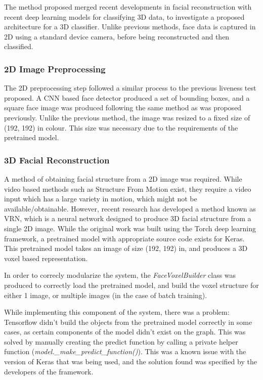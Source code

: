 \documentclass[11pt,a4paper]{article}
\begin{document}
            The method proposed merged recent developments in facial reconstruction with recent deep learning models for classifying 3D data, to investigate a proposed
            architecture for a 3D classifier. Unlike previous methods, face data is captured in 2D using a standard device camera, before being reconstructed and then classified.

        \subsubsection{2D Image Preprocessing}
            The 2D preprocessing step followed a similar process to the previous liveness test proposed. A CNN based face detector produced a set of bounding boxes, and a square face image was produced
            following the same method as was proposed previously. Unlike the previous method, the image was resized to a fixed size of (192, 192) in colour. This size was necessary due to the requirements
            of the pretrained model.

        \subsubsection{3D Facial Reconstruction}
            A method of obtaining facial structure from a 2D image was required. While video based methods such as Structure From Motion exist, they require a video input which has a large variety in motion, which might not be available/obtainable.
            However, recent research has developed a method known as VRN, which is a neural network designed to produce 3D facial structure from a single 2D image. \cite{3DReconstructionMethod}
            While the original work was built using the Torch deep learning framework, a pretrained model with appropriate source code exists for Keras. \cite{VRNTorchToKeras} This pretrained model
            takes an image of size (192, 192) in, and produces a 3D voxel based representation. 

            In order to correcly modularize the system, the \emph{FaceVoxelBuilder} class was produced to correctly load the pretrained model, and build the voxel structure for either 1 image, or multiple images (in the case of batch training).

            While implementing this component of the system, there was a problem: Tensorflow didn't build the objects from the pretrained model correctly in some cases, as certain components of the model didn't exist on the graph. This was solved by manually creating the predict function by calling a private helper function (\emph{model.\_make\_predict\_function()}).
            This was a known issue with the version of Keras that was being used, and the solution found was specified by the developers of the framework. \cite{KerasVoxNetBug}
\end{document}
